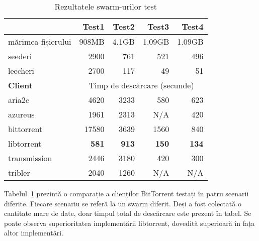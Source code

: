 \begin{table}[ht]
  \centering
  \begin{tabular}{@{}lrrrr@{}}
    \toprule
    & \textbf{Test1} & \textbf{Test2} & \textbf{Test3} &
    \textbf{Test4} \\
    \midrule
    mărimea fișierului & 908MB & 4.1GB & 1.09GB & 1.09GB	\\
    seederi & 2900 & 761 & 521 & 496	\\
    leecheri & 2700 & 117 & 49 & 51	\\
    \midrule
    \textbf{Client} & \multicolumn{4}{c}{Timp de descărcare (secunde)} \\
    \midrule
    aria2c & 4620 & 3233 & 580 & 623 \\
    azureus & 1961 & 2313 & N/A & 420 \\
    bittorrent & 17580 & 3639 & 1560 & 840 \\
    libtorrent & \textbf{581} & \textbf{913} & \textbf{150} & \textbf{134} \\
    transmission & 2446 & 3180 & 420 & 300 \\
    tribler & 2040 & 1260 & N/A & N/A \\
    \bottomrule
  \end{tabular}
  \caption{Rezultatele swarm-urilor test}
  \label{table:virt-infra:testsw}
\end{table}

Tabelul~\ref{table:virt-infra:testsw} prezintă o comparație a clienților
BitTorrent testați în patru scenarii diferite. Fiecare scenariu se referă
la un swarm diferit. Deși a fost colectată o cantitate mare de date, doar
timpul total de descărcare este prezent în tabel. Se poate observa
superioritatea implementării libtorrent, dovedită superioară în fața altor
implementări.
